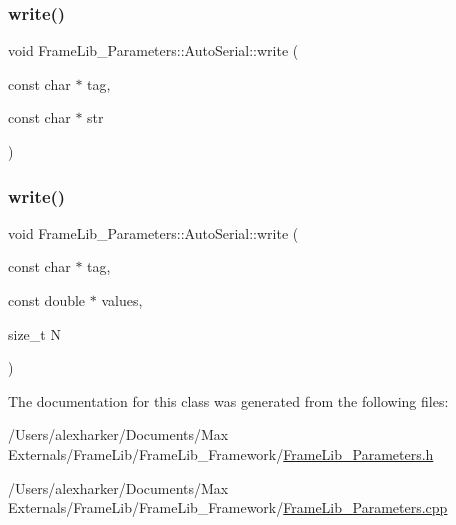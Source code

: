 \subsubsection{\texorpdfstring{write()}{write()}\hspace{0.1cm}{\footnotesize\ttfamily [2/3]}}
{\footnotesize\ttfamily void Frame\+Lib\+\_\+\+Parameters\+::\+Auto\+Serial\+::write (\begin{DoxyParamCaption}\item[{const char $\ast$}]{tag,  }\item[{const char $\ast$}]{str }\end{DoxyParamCaption})\hspace{0.3cm}{\ttfamily [inline]}}

\mbox{\label{class_frame_lib___parameters_1_1_auto_serial_aabe8357d608f708e334dcc7fd22ebddd}} 
\subsubsection{\texorpdfstring{write()}{write()}\hspace{0.1cm}{\footnotesize\ttfamily [3/3]}}
{\footnotesize\ttfamily void Frame\+Lib\+\_\+\+Parameters\+::\+Auto\+Serial\+::write (\begin{DoxyParamCaption}\item[{const char $\ast$}]{tag,  }\item[{const double $\ast$}]{values,  }\item[{size\+\_\+t}]{N }\end{DoxyParamCaption})\hspace{0.3cm}{\ttfamily [inline]}}



The documentation for this class was generated from the following files\+:\begin{DoxyCompactItemize}
\item 
/\+Users/alexharker/\+Documents/\+Max Externals/\+Frame\+Lib/\+Frame\+Lib\+\_\+\+Framework/\hyperlink{_frame_lib___parameters_8h}{Frame\+Lib\+\_\+\+Parameters.\+h}\item 
/\+Users/alexharker/\+Documents/\+Max Externals/\+Frame\+Lib/\+Frame\+Lib\+\_\+\+Framework/\hyperlink{_frame_lib___parameters_8cpp}{Frame\+Lib\+\_\+\+Parameters.\+cpp}\end{DoxyCompactItemize}
